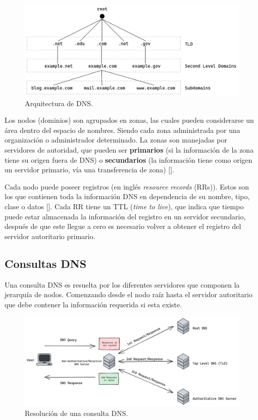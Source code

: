 \begin{figure}[!ht]
    \centering
    \includegraphics[width=\linewidth]{draws/dns-arch.png}
    \caption{Arquitectura de DNS.}
\end{figure}

Los nodos (dominios) son agrupados en zonas, las cuales pueden considerarse un área dentro del espacio de nombres. Siendo cada zona administrada por una organización o administrador determinado. La zonas son manejadas por servidores de autoridad, que pueden ser \textbf{primarios} (si la información de la zona tiene su origen fuera de DNS) o \textbf{secundarios} (la información tiene como origen un servidor primario, vía una transferencia de zona) [\cite{Vixie_2007}].

Cada nodo puede poseer registros (en inglés \textit{resource records} (RRs)). Estos son los que contienen toda la información DNS en dependencia de su nombre, tipo, clase o datos [\cite{rfc_1035}]. Cada RR tiene un TTL (\textit{time to live}), que indica que tiempo puede estar almacenada la información del registro en un servidor secundario, después de que este llegue a cero es necesario volver a obtener el registro del servidor autoritario primario.

\subsection{Consultas DNS}

Una consulta DNS es resuelta por los diferentes servidores que componen la jerarquía de nodos. Comenzando desde el nodo raíz hasta el servidor autoritario que debe contener la información requerida si esta existe.

\begin{figure}[!ht]
    \centering
    \includegraphics[width=\linewidth]{draws/dns-query.png}
    \caption{Resolución de una consulta DNS.}
\end{figure}

